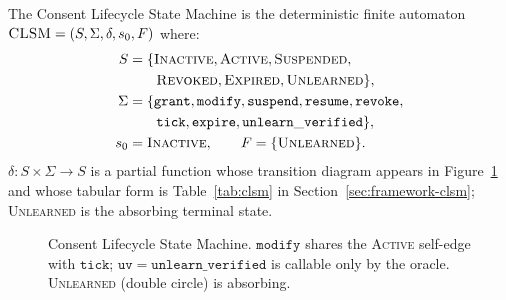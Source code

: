 \begin{definition}[\clsm]\label{def:clsm}
The Consent Lifecycle State Machine is the deterministic finite
automaton $\textsc{CLSM} = (S, \Sigma, \delta, s_0, F)$ where:
\begin{align*}
S &= \{\textsc{Inactive}, \textsc{Active}, \textsc{Suspended}, \\
  &\qquad\textsc{Revoked}, \textsc{Expired}, \textsc{Unlearned}\}, \\
\Sigma &= \{\mathtt{grant}, \mathtt{modify}, \mathtt{suspend},
    \mathtt{resume}, \mathtt{revoke}, \\
  &\qquad \mathtt{tick}, \mathtt{expire}, \mathtt{unlearn\_verified}\}, \\
s_0 &= \textsc{Inactive},\qquad F = \{\textsc{Unlearned}\}.
\end{align*}
$\delta: S \times \Sigma \to S$ is a partial function whose transition
diagram appears in Figure~\ref{fig:clsm} and whose tabular form is
Table~\ref{tab:clsm} in Section~\ref{sec:framework-clsm};
\textsc{Unlearned} is the absorbing terminal state.
\end{definition}

\begin{figure}[t]
\centering
{}
\caption{Consent Lifecycle State Machine.
$\mathtt{modify}$ shares the \textsc{Active} self-edge with
$\mathtt{tick}$; $\mathtt{uv} \!=\! \mathtt{unlearn\_verified}$
is callable only by the oracle.
\textsc{Unlearned} (double circle) is absorbing.}
\label{fig:clsm}
\end{figure}


